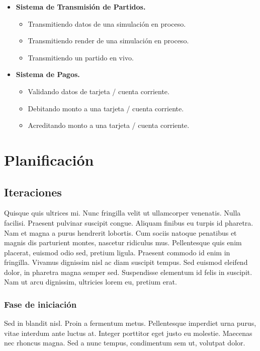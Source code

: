 \documentclass[a4paper, 10pt, twoside]{article}
\begin{document}
\begin{itemize}
  \item \textbf{Sistema de Transmisión de Partidos.}
  \begin{itemize}
    \item Transmitiendo datos de una simulación en proceso.
    \item Transmitiendo render de una simulación en proceso.
    \item Transmitiendo un partido en vivo.
  \end{itemize}

  \item \textbf{Sistema de Pagos.}
  \begin{itemize}
    \item Validando datos de tarjeta / cuenta corriente.
    \item Debitando monto a una tarjeta / cuenta corriente.
    \item Acreditando monto a una tarjeta / cuenta corriente.
  \end{itemize}

\end{itemize}

\newpage


\section{Planificación}

\subsection{Iteraciones}
Quisque quis ultrices mi. Nunc fringilla velit ut ullamcorper venenatis. Nulla facilisi. Praesent pulvinar suscipit congue. Aliquam finibus eu turpis id pharetra. Nam et magna a purus hendrerit lobortis. Cum sociis natoque penatibus et magnis dis parturient montes, nascetur ridiculus mus. Pellentesque quis enim placerat, euismod odio sed, pretium ligula. Praesent commodo id enim in fringilla. Vivamus dignissim nisl ac diam suscipit tempus. Sed euismod eleifend dolor, in pharetra magna semper sed. Suspendisse elementum id felis in suscipit. Nam ut arcu dignissim, ultricies lorem eu, pretium erat.

\subsubsection{Fase de iniciación}
Sed in blandit nisl. Proin a fermentum metus. Pellentesque imperdiet urna purus, vitae interdum ante luctus at. Integer porttitor eget justo eu molestie. Maecenas nec rhoncus magna. Sed a nunc tempus, condimentum sem ut, volutpat dolor.
\end{document}
